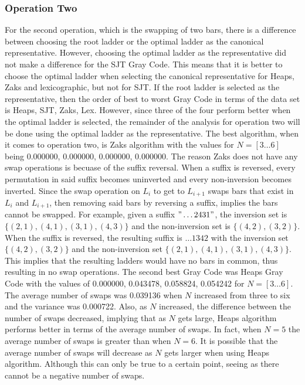 \subsubsection{Operation Two}
For the second operation, which is the swapping of two bars, there is a difference between choosing the root ladder or the optimal ladder as 
the canonical representative. However, choosing the optimal ladder as the representative did not make a difference for the SJT Gray Code.
This means that it is better to choose the optimal ladder when selecting the canonical representative for Heaps, Zaks and lexicographic, but 
not for SJT. If the root ladder is selected as the representative, then the order of best to worst Gray Code in terms of the data set is 
Heaps, SJT, Zaks, Lex. However, since three of the four perform better when the optimal ladder is selected, the remainder of the analysis 
for operation two will be done using the optimal ladder as the representative. The best algorithm, when it comes to operation two, is 
Zaks algorithm with the values for $N=[3 \dots 6]$ being 0.000000, 0.000000, 0.000000, 0.000000. The reason Zaks does not have any swap operations 
is becuase of the suffix reversal. When a suffix is reversed, every permutation in said suffix becomes uninverted and every non-inversion 
becomes inverted. Since the swap operation on $L_{i}$ to get to $L_{i+1}$ swaps bars that exist in $L_{i}$ and $L_{i+1}$, then removing 
said bars by reversing a suffix, implies the bars cannot be swapped. For example, given a suffix $"\dots2431"$, the inversion set is $\{(2,1),
(4,1), (3,1), (4,3)\}$ and the non-inversion set is $\{(4,2), (3,2)\}$. When the suffix is reversed, the resulting suffix is $\dots1342$ with the 
inversion set $\{(4,2), (3,2)\}$ and the non-inversion set $\{(2,1), (4,1), (3,1), (4,3)\}$. This implies that the resulting ladders would have no 
bars in common, thus resulting in no swap operations. The second best Gray Code was Heaps Gray Code with the values of 0.000000, 0.043478, 
0.058824, 0.054242 for $N=[3 \dots 6]$. The average number of swaps was 0.039136 when $N$ increased from three to six and the variance was 
0.000722. Also, as $N$ increased, the difference between the number of swaps decreased, implying that as $N$ gets large, Heaps algorithm performs 
better in terms of the average number of swaps. In fact, when $N=5$ the average number of swaps is greater 
than when $N=6$. It is possible that the average number of swaps will decrease as $N$ gets larger when 
using Heaps algorithm. Although this can only be true to a certain point, seeing as there cannot be a negative number of swaps.
